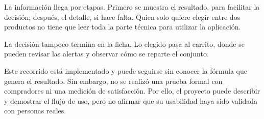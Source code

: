 La información llega por etapas. Primero se muestra el resultado, para facilitar la decisión; después, el detalle, si hace falta. Quien solo quiere elegir entre dos productos no tiene que leer toda la parte técnica para utilizar la aplicación.

La decisión tampoco termina en la ficha. Lo elegido pasa al carrito, donde se pueden revisar las alertas y observar cómo se reparte el conjunto.

Este recorrido está implementado y puede seguirse sin conocer la fórmula que genera el resultado. Sin embargo, no se realizó una prueba formal con compradores ni una medición de satisfacción. Por ello, el proyecto puede describir y demostrar el flujo de uso, pero no afirmar que su usabilidad haya sido validada con personas reales.
